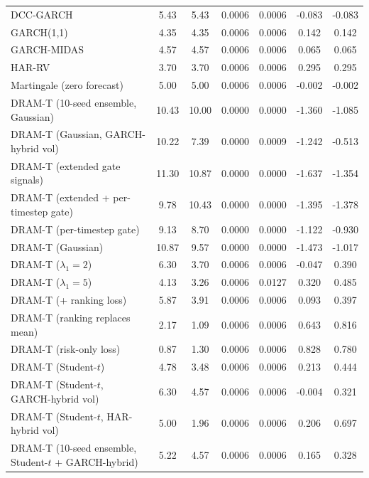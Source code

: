 \begin{table}
\begin{tabular}{lcccccc}
DCC-GARCH & 5.43 & 5.43 & 0.0006 & 0.0006 & -0.083 & -0.083 \\
GARCH(1,1) & 4.35 & 4.35 & 0.0006 & 0.0006 & 0.142 & 0.142 \\
GARCH-MIDAS & 4.57 & 4.57 & 0.0006 & 0.0006 & 0.065 & 0.065 \\
HAR-RV & 3.70 & 3.70 & 0.0006 & 0.0006 & 0.295 & 0.295 \\
Martingale (zero forecast) & 5.00 & 5.00 & 0.0006 & 0.0006 & -0.002 & -0.002 \\
DRAM-T (10-seed ensemble, Gaussian) & 10.43 & 10.00 & 0.0000 & 0.0000 & -1.360 & -1.085 \\
DRAM-T (Gaussian, GARCH-hybrid vol) & 10.22 & 7.39 & 0.0000 & 0.0009 & -1.242 & -0.513 \\
DRAM-T (extended gate signals) & 11.30 & 10.87 & 0.0000 & 0.0000 & -1.637 & -1.354 \\
DRAM-T (extended + per-timestep gate) & 9.78 & 10.43 & 0.0000 & 0.0000 & -1.395 & -1.378 \\
DRAM-T (per-timestep gate) & 9.13 & 8.70 & 0.0000 & 0.0000 & -1.122 & -0.930 \\
DRAM-T (Gaussian) & 10.87 & 9.57 & 0.0000 & 0.0000 & -1.473 & -1.017 \\
DRAM-T ($\lambda_1=2$) & 6.30 & 3.70 & 0.0006 & 0.0006 & -0.047 & 0.390 \\
DRAM-T ($\lambda_1=5$) & 4.13 & 3.26 & 0.0006 & 0.0127 & 0.320 & 0.485 \\
DRAM-T (+ ranking loss) & 5.87 & 3.91 & 0.0006 & 0.0006 & 0.093 & 0.397 \\
DRAM-T (ranking replaces mean) & 2.17 & 1.09 & 0.0006 & 0.0006 & 0.643 & 0.816 \\
DRAM-T (risk-only loss) & 0.87 & 1.30 & 0.0006 & 0.0006 & 0.828 & 0.780 \\
DRAM-T (Student-$t$) & 4.78 & 3.48 & 0.0006 & 0.0006 & 0.213 & 0.444 \\
DRAM-T (Student-$t$, GARCH-hybrid vol) & 6.30 & 4.57 & 0.0006 & 0.0006 & -0.004 & 0.321 \\
DRAM-T (Student-$t$, HAR-hybrid vol) & 5.00 & 1.96 & 0.0006 & 0.0006 & 0.206 & 0.697 \\
DRAM-T (10-seed ensemble, Student-$t$ + GARCH-hybrid) & 5.22 & 4.57 & 0.0006 & 0.0006 & 0.165 & 0.328 \\
\bottomrule
\end{tabular}
\end{table}
